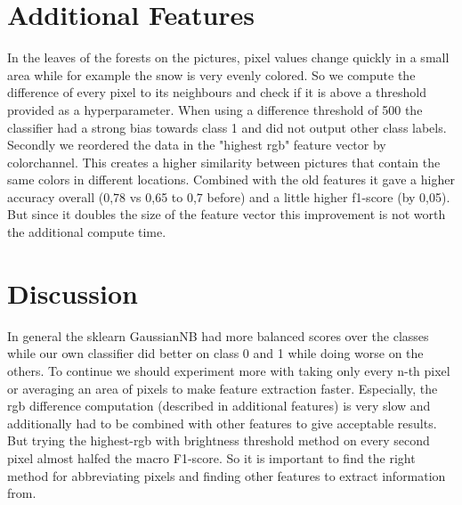\documentclass[a4paper,12pt]{article}
\newcommand{\initials}[1]{\marginpar{\quad\texttt{#1}}}
\begin{document}
\section{Additional Features}
In the leaves of the forests on the pictures, pixel values change quickly in a small area while for example the snow is very evenly colored. So we compute the difference of every pixel to its neighbours and check if it is above a threshold provided as a hyperparameter. When using a difference threshold of 500 the classifier had a strong bias towards class 1 and did not output other class labels.\\
Secondly we reordered the data in the "highest rgb" feature vector by colorchannel. This creates a higher similarity between pictures that contain the same colors in different locations. Combined with the old features it gave a higher accuracy overall (0,78 vs 0,65 to 0,7 before) and a little higher f1-score (by 0,05). But since it doubles the size of the feature vector this improvement is not worth the additional compute time.
\initials{TB}

\section{Discussion}
In general the sklearn GaussianNB had more balanced scores over the classes while our own classifier did better on class 0 and 1 while doing worse on the others.
To continue we should experiment more with taking only every n-th pixel or averaging an area of pixels to make feature extraction faster. Especially, the rgb difference computation (described in additional features) is very slow and additionally had to be combined with other features to give acceptable results. But trying the highest-rgb with brightness threshold method on every second pixel almost halfed the macro F1-score. So it is important to find the right method for abbreviating pixels and finding other features to extract information from.
\initials{TB}
\end{document}
